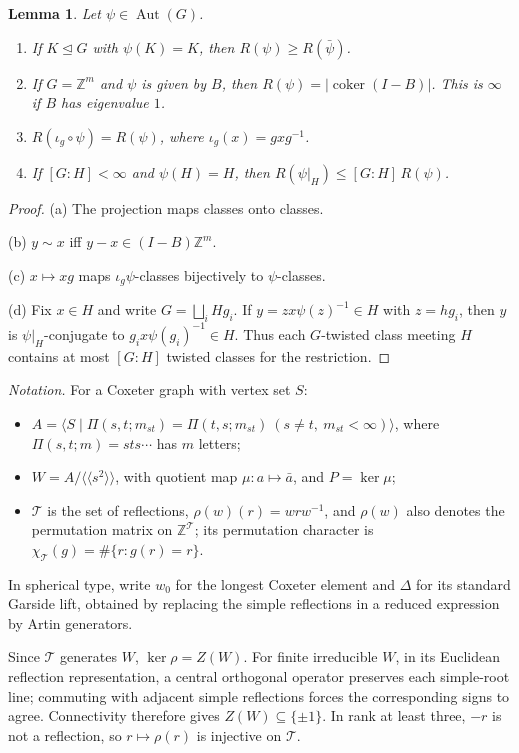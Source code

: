 \documentclass[11pt]{amsart}
\newtheorem{lemma}[theorem]{Lemma}
\theoremstyle{definition}
\newcommand{\Z}{\mathbb{Z}}
\newcommand{\T}{\mathcal{T}}
\newcommand{\Aut}{\operatorname{Aut}}
\newcommand{\coker}{\operatorname{coker}}
\begin{document}
\begin{lemma}\label{lem:reid}
Let $\psi\in\Aut(G)$.
\begin{enumerate}[label=(\alph*)]
\item If $K\trianglelefteq G$ with $\psi(K)=K$, then $R(\psi)\ge R(\bar\psi)$.
\item If $G=\Z^m$ and $\psi$ is given by $B$, then $R(\psi)=|\coker(I-B)|$. This is $\infty$ if $B$ has eigenvalue $1$.
\item $R(\iota_g\circ\psi)=R(\psi)$, where $\iota_g(x)=gxg^{-1}$.
\item If $[G:H]<\infty$ and $\psi(H)=H$, then $R(\psi|_H)\le[G:H]\,R(\psi)$.
\end{enumerate}
\end{lemma}
\begin{proof}
(a) The projection maps classes onto classes.

(b) $y\sim x$ iff $y-x\in(I-B)\Z^m$.

(c) $x\mapsto xg$ maps $\iota_g\psi$-classes bijectively to $\psi$-classes.

(d) Fix $x\in H$ and write $G=\bigsqcup_iHg_i$. If $y=zx\psi(z)^{-1}\in H$ with $z=hg_i$, then $y$ is $\psi|_H$-conjugate to
$g_ix\psi(g_i)^{-1}\in H$. Thus each $G$-twisted class meeting $H$ contains at most
$[G:H]$ twisted classes for the restriction.
\end{proof}

\emph{Notation.} For a Coxeter graph with vertex set $S$:
\begin{itemize}
\item $A=\langle S\mid\Pi(s,t;m_{st})=\Pi(t,s;m_{st})\ (s\ne t,\ m_{st}<\infty)\rangle$, where $\Pi(s,t;m)=sts\cdots$
has $m$ letters;
\item $W=A/\langle\!\langle s^2\rangle\!\rangle$, with quotient map $\mu\colon a\mapsto\bar a$, and $P=\ker\mu$;
\item $\T$ is the set of reflections, $\rho(w)(r)=wrw^{-1}$, and $\rho(w)$ also denotes the permutation matrix on
$\Z^\T$; its permutation character is $\chi_\T(g)=\#\{r:g(r)=r\}$.
\end{itemize}
In spherical type, write $w_0$ for the longest Coxeter element and $\Delta$ for its standard
Garside lift, obtained by replacing the simple reflections in a reduced expression by Artin generators.

Since $\T$ generates $W$, $\ker\rho=Z(W)$. For finite irreducible $W$, in its Euclidean reflection
representation, a central orthogonal operator preserves each simple-root line; commuting with adjacent simple
reflections forces the corresponding signs to agree. Connectivity therefore gives $Z(W)\subseteq\{\pm1\}$.
In rank at least three, $-r$ is not a reflection, so
$r\mapsto\rho(r)$ is injective on $\T$.
\end{document}
